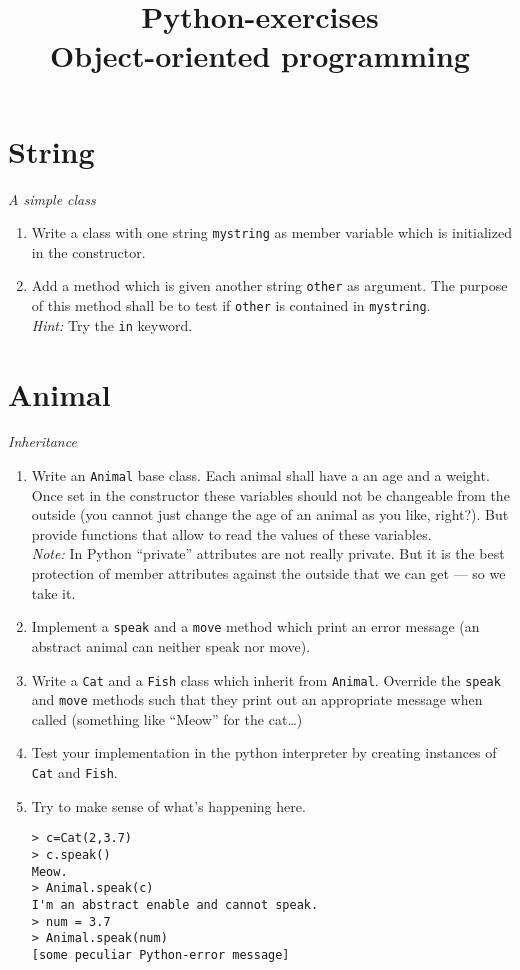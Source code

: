 \documentclass[12pt]{article}
\title{Python-exercises\\ Object-oriented programming}
\begin{document}

\maketitle

\section{String}
\textit{A simple class}
\begin{enumerate}
\item Write a class with one string \texttt{mystring} as member variable which is initialized in the constructor.
\item Add a method which is given another string \texttt{other} as argument. The purpose of this method shall be to test if \texttt{other} is contained in \texttt{mystring}.\\
\textit{Hint:} Try the \texttt{in} keyword.
\end{enumerate}

\section{Animal}
\textit{Inheritance}\\
\begin{enumerate}
\item Write an \texttt{Animal} base class. Each animal shall have a an age and a weight. Once set in the constructor these variables should not be changeable from the outside (you cannot just change the age of an animal as you like, right?). But provide functions that allow to read the values of these variables.\\
\emph{Note:} In Python ``private'' attributes are not really private. But it is the best protection of member attributes against the outside that we can get --- so we take it.
\item Implement a \texttt{speak} and a \texttt{move} method which print an error message (an abstract animal can neither speak nor move).
\item Write a \texttt{Cat} and a \texttt{Fish} class which inherit from \texttt{Animal}. Override the \texttt{speak} and \texttt{move} methods such that they print out an appropriate message when called (something like ``Meow'' for the cat\dots)
\item Test your implementation in the python interpreter by creating instances of \texttt{Cat} and \texttt{Fish}.
\item Try to make sense of what's happening here.
\begin{lstlisting}
> c=Cat(2,3.7)
> c.speak()
Meow.
> Animal.speak(c)
I'm an abstract enable and cannot speak.
> num = 3.7
> Animal.speak(num)
[some peculiar Python-error message]
\end{lstlisting}
\end{enumerate}
\end{document}
